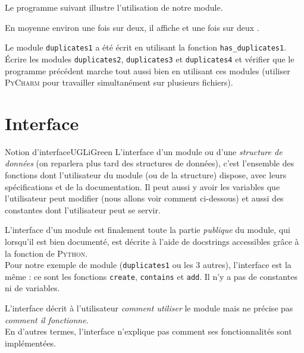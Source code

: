 \documentclass[a4paper,12pt,french]{book}
\begin{document}
Le programme suivant illustre l'utilisation de notre module.


En moyenne environ une fois sur deux, il affiche  et une fois sur deux .\\

\begin{exercice}[]
	Le module \texttt{duplicates1} a été écrit en utilisant la fonction \texttt{has\_duplicates1}.\\
	\'Ecrire les modules \texttt{duplicates2}, \texttt{duplicates3} et \texttt{duplicates4} et vérifier que le programme précédent marche tout aussi bien en utilisant ces modules (utiliser \textsc{PyCharm} pour travailler simultanément sur plusieurs fichiers).
\end{exercice}

\section{Interface}

\begin{encadrecolore}{Notion d'interface}{UGLiGreen}
L'interface d'un module ou d'une \textit{structure de données} (on reparlera plus tard des structures de données), c'est l'ensemble des fonctions dont l'utilisateur du module (ou de la structure) dispose, avec leurs spécifications et de la documentation. Il peut aussi y avoir les variables que l'utilisateur peut modifier (nous allons voir comment ci-dessous) et aussi des \og constantes\fg{} dont l'utilisateur peut se servir.\\

\end{encadrecolore}

L'interface d'un module est finalement toute la partie \textit{publique} du module, qui lorsqu'il est bien documenté, est décrite à l'aide de docstrings accessibles grâce à la fonction  de \textsc{Python}.\\
Pour notre exemple de module (\texttt{duplicates1} ou les 3 autres), l'interface est la même : ce sont les fonctions \texttt{create}, \texttt{contains} et \texttt{add}. Il n'y a pas de constantes ni de variables.

\begin{remarque}
L'interface décrit à l'utilisateur \textit{comment utiliser} le module mais ne précise pas \textit{comment il fonctionne}.\\
En d'autres termes, l'interface n'explique pas comment ses fonctionnalités sont implémentées.
\end{remarque}
\end{document}
